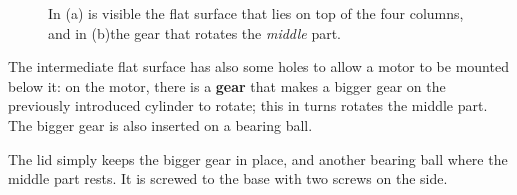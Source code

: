 \documentclass[]{article}
\begin{document}
\begin{figure}[H]
	\caption{In (a) is visible the flat surface that lies on top of the four columns, and in (b)the gear that rotates the \textit{middle} part.}
\end{figure}


The intermediate flat surface has also some holes to allow a motor to be mounted below it: on the motor, there is a \textbf{gear} that makes a bigger gear on the previously introduced cylinder to rotate; this in turns rotates the middle part. 
The bigger gear is also inserted on a bearing ball.


The lid simply keeps the bigger gear in place, and another bearing ball
where the middle part rests. It is screwed to the base with two screws on the side.
\end{document}

